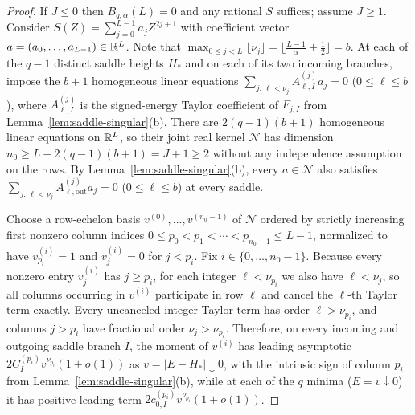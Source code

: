 \begin{proof}
If $J\le 0$ then $B_{q,\alpha}(L)=0$ and any rational $S$ suffices; assume $J\ge 1$. Consider $S(Z)=\sum_{j=0}^{L-1} a_j Z^{2j+1}$ with coefficient vector $a=(a_0,\dots,a_{L-1})\in\mathbb{R}^L$. Note that $\max_{0\le j<L}\lfloor\nu_j\rfloor=\lfloor\frac{L-1}{\alpha}+\frac{1}{2}\rfloor=b$. At each of the $q-1$ distinct saddle heights $H_*$ and on each of its two incoming branches, impose the $b+1$ homogeneous linear equations $\sum_{j:\,\ell<\nu_j} A_{\ell,I}^{(j)} a_j = 0$ ($0\le\ell\le b$), where $A_{\ell,I}^{(j)}$ is the signed-energy Taylor coefficient of $F_{j,I}$ from Lemma~\ref{lem:saddle-singular}(b). There are $2(q-1)(b+1)$ homogeneous linear equations on $\mathbb{R}^L$, so their joint real kernel $\mathcal N$ has dimension $n_0\ge L-2(q-1)(b+1)=J+1\ge 2$ without any independence assumption on the rows. By Lemma~\ref{lem:saddle-singular}(b), every $a\in\mathcal N$ also satisfies $\sum_{j:\,\ell<\nu_j} A_{\ell,\mathrm{out}}^{(j)} a_j=0$ ($0\le\ell\le b$) at every saddle.

Choose a row-echelon basis $v^{(0)},\dots,v^{(n_0-1)}$ of $\mathcal N$ ordered by strictly increasing first nonzero column indices $0\le p_0<p_1<\cdots<p_{n_0-1}\le L-1$, normalized to have $v^{(i)}_{p_i}=1$ and $v^{(i)}_j=0$ for $j<p_i$. Fix $i\in\{0,\dots,n_0-1\}$. Because every nonzero entry $v^{(i)}_j$ has $j\ge p_i$, for each integer $\ell<\nu_{p_i}$ we also have $\ell<\nu_j$, so all columns occurring in $v^{(i)}$ participate in row $\ell$ and cancel the $\ell$-th Taylor term exactly. Every uncanceled integer Taylor term has order $\ell>\nu_{p_i}$, and columns $j>p_i$ have fractional order $\nu_j>\nu_{p_i}$. Therefore, on every incoming and outgoing saddle branch $I$, the moment of $v^{(i)}$ has leading asymptotic $2 C_I^{(p_i)} v^{\nu_{p_i}}(1+o(1))$ as $v=|E-H_*|\downarrow 0$, with the intrinsic sign of column $p_i$ from Lemma~\ref{lem:saddle-singular}(b), while at each of the $q$ minima ($E=v\downarrow 0$) it has positive leading term $2c_{0,I}^{(p_i)} v^{\nu_{p_i}}(1+o(1))$.


\end{proof}
